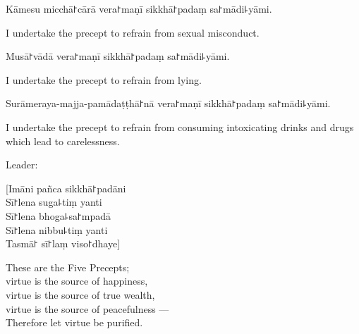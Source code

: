 \begin{precept}
  \setcounter{enumi}{2}
  \item Kāmesu micchā꜓cārā vera꜓maṇī sikkhā꜓padaṃ sa꜓mādi꜕yāmi.
\end{precept}

\begin{english}
  I undertake the precept to refrain from sexual misconduct.
\end{english}

\clearpage

\begin{precept}
  \setcounter{enumi}{3}
  \item Musā꜓vādā vera꜓maṇī sikkhā꜓padaṃ sa꜓mādi꜕yāmi.
\end{precept}

\begin{english}
  I undertake the precept to refrain from lying.
\end{english}

\begin{precept}
  \setcounter{enumi}{4}
  \item Surāmeraya-majja-pamādaṭṭhā꜓nā vera꜓maṇī sikkhā꜓padaṃ sa꜓mādi꜕yāmi.
\end{precept}

\begin{english}
  I undertake the precept to refrain from consuming intoxicating drinks and drugs which lead to carelessness.
\end{english}

\begin{instruction}
  Leader:
\end{instruction}


[Imāni pañca sikkhā꜓padāni\\
Sī꜓lena suga꜕tiṃ yanti\\
Sī꜓lena bhoga꜕sa꜓mpadā\\
Sī꜓lena nibbu꜕tiṃ yanti\\
Tasmā꜓ sī꜓laṃ viso꜓dhaye]

\begin{english}
  These are the Five Precepts;\\
  virtue is the source of happiness,\\
  virtue is the source of true wealth,\\
  virtue is the source of peacefulness ---\\
  Therefore let virtue be purified.
\end{english}

